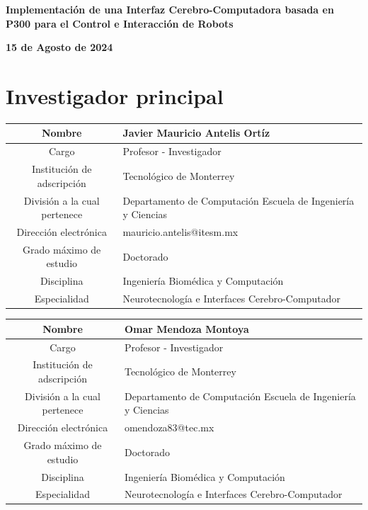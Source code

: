 \documentclass[12pt]{article}
\begin{document}
\begin{flushleft}
    \textbf{\Large Implementación de una Interfaz Cerebro-Computadora basada en P300 para el Control e Interacción de Robots}
    \par
    \textbf{15 de Agosto de 2024}
\end{flushleft}

\section{Investigador principal}

\begin{table}[H]
    \centering
    \begin{tabular}{|c|p{7cm}|} \hline
        Nombre & Javier Mauricio Antelis Ortíz \\ \hline
        Cargo & Profesor - Investigador \\ \hline
        Institución de adscripción & Tecnológico de Monterrey \\ \hline
        División a la cual pertenece & Departamento de Computación \newline Escuela de Ingeniería y Ciencias \\ \hline
        Dirección electrónica & mauricio.antelis@itesm.mx \\ \hline
        Grado máximo de estudio & Doctorado \\ \hline
        Disciplina & Ingeniería Biomédica y Computación \\ \hline
        Especialidad & Neurotecnología e Interfaces Cerebro-Computador \\ \hline
    \end{tabular}
\end{table}

\begin{table}[H]
    \centering
    \begin{tabular}{|c|p{7cm}|} \hline
        Nombre & Omar Mendoza Montoya \\ \hline
        Cargo & Profesor - Investigador \\ \hline
        Institución de adscripción & Tecnológico de Monterrey \\ \hline
        División a la cual pertenece & Departamento de Computación \newline Escuela de Ingeniería y Ciencias \\ \hline
        Dirección electrónica & omendoza83@tec.mx \\ \hline
        Grado máximo de estudio & Doctorado \\ \hline
        Disciplina & Ingeniería Biomédica y Computación \\ \hline
        Especialidad & Neurotecnología e Interfaces Cerebro-Computador \\ \hline
    \end{tabular}
\end{table}
\end{document}
